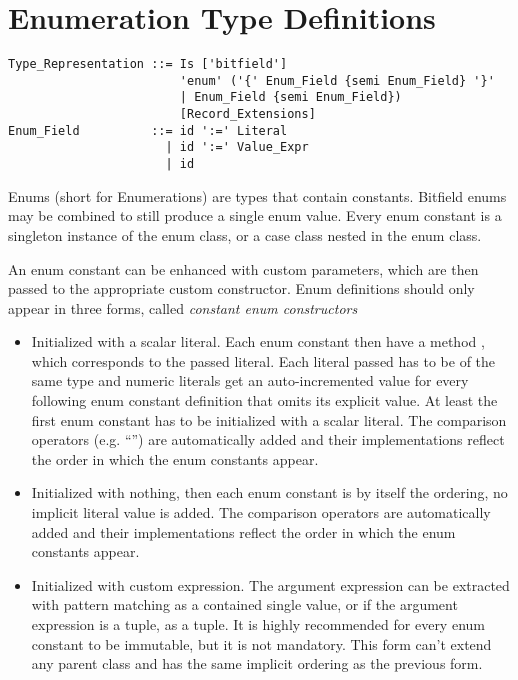 \section{Enumeration Type Definitions}
\label{sec:enums}

\syntax\begin{lstlisting}
Type_Representation ::= Is ['bitfield'] 
                        'enum' ('{' Enum_Field {semi Enum_Field} '}'
                        | Enum_Field {semi Enum_Field})
                        [Record_Extensions]
Enum_Field          ::= id ':=' Literal
                      | id ':=' Value_Expr
                      | id
\end{lstlisting}

Enums (short for Enumerations) are types that contain constants. Bitfield enums may be combined to still produce a single enum value. Every enum constant is a singleton instance of the enum class, or a case class nested in the enum class. 

An enum constant can be enhanced with custom parameters, which are then passed to the appropriate custom constructor. Enum definitions should only appear in three forms, called {\em constant enum constructors}
\begin{itemize}
  \item Initialized with a scalar literal. Each enum constant then have a method , which corresponds to the passed literal. Each literal passed has to be of the same type and numeric literals get an auto-incremented value for every following enum constant definition that omits its explicit value. At least the first enum constant has to be initialized with a scalar literal. The comparison operators (e.g. ``\code{<}'') are automatically added and their implementations reflect the order in which the enum constants appear.
  \item Initialized with nothing, then each enum constant is by itself the ordering, no implicit literal value is added. The comparison operators are automatically added and their implementations reflect the order in which the enum constants appear. 
  \item Initialized with custom expression. The argument expression can be extracted with pattern matching as a contained single value, or if the argument expression is a tuple, as a tuple. It is highly recommended for every enum constant to be immutable, but it is not mandatory. This form can't extend any parent class and has the same implicit ordering as the previous form. 
\end{itemize}





